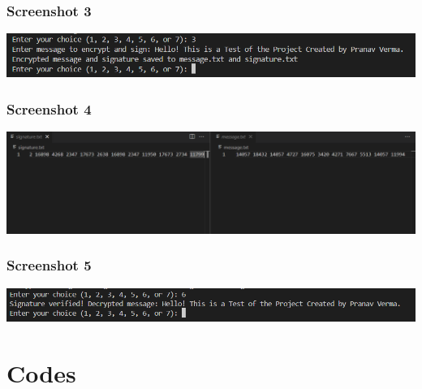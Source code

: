 \documentclass[12pt,a4paper]{report}
\begin{document}
\subsection{Screenshot 3}
\includegraphics[width=1\textwidth]{screenshot-6.png}
\subsection{Screenshot 4}
\includegraphics[width=1\textwidth]{screenshot-7.png}
\subsection{Screenshot 5}
\includegraphics[width=1\textwidth]{screenshot-8.png}


\chapter{Codes}
\end{document}
